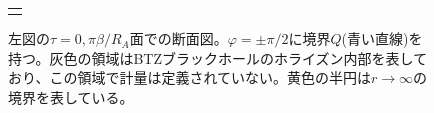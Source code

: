 \begin{description}
\begin{figure}[h]
\begin{tabular}{c}
\begin{minipage}{0.50\hsize}
		\caption{左図の$\tau=0,\pi\beta/R_A$面での断面図。$\varphi=\pm\pi/2$に境界$Q$(青い直線)を持つ。灰色の領域はBTZブラックホールのホライズン内部を表しており、この領域で計量は定義されていない。黄色の半円は$r\to \infty$の境界を表している。}
		\label{fig:adsbcftbtzsection}
	\end{minipage}
	\end{tabular}
	
\end{figure}

\end{description}
